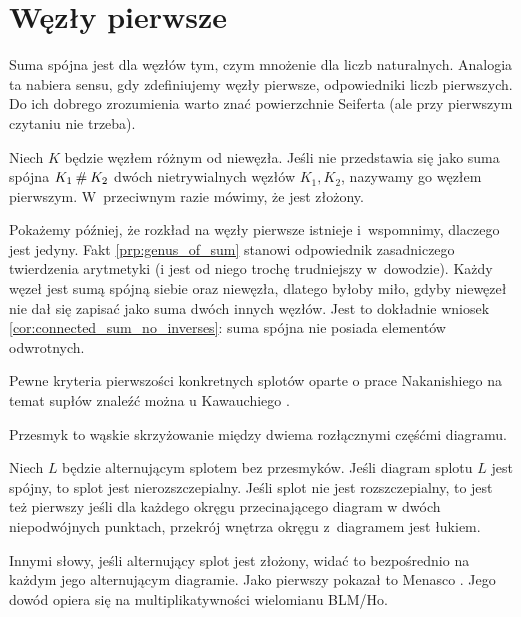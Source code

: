 
\section{Węzły pierwsze}
%
Suma spójna jest dla węzłów tym, czym mnożenie dla liczb naturalnych.
Analogia ta nabiera sensu, gdy zdefiniujemy węzły pierwsze, odpowiedniki liczb pierwszych.
Do ich dobrego zrozumienia warto znać powierzchnie Seiferta (ale przy pierwszym czytaniu nie trzeba).

\begin{definition}
\label{def:prime_knot}%
    Niech $K$ będzie węzłem różnym od niewęzła.
    Jeśli nie przedstawia się jako suma spójna $K_1 \mathbin{\#} K_2$ dwóch nietrywialnych węzłów $K_1, K_2$, nazywamy go węzłem pierwszym.
    W~przeciwnym razie mówimy, że jest złożony.
%
\end{definition}

Pokażemy później, że rozkład na węzły pierwsze istnieje i~wspomnimy, dlaczego jest jedyny.
Fakt \ref{prp:genus_of_sum} stanowi odpowiednik zasadniczego twierdzenia arytmetyki (i jest od niego trochę trudniejszy w~dowodzie).
Każdy węzeł jest sumą spójną siebie oraz niewęzła, dlatego byłoby miło, gdyby niewęzeł nie dał się zapisać jako suma dwóch innych węzłów.
Jest to dokładnie wniosek \ref{cor:connected_sum_no_inverses}: suma spójna nie posiada elementów odwrotnych.

Pewne kryteria pierwszości konkretnych splotów oparte o prace Nakanishiego na temat supłów znaleźć można u Kawauchiego \cite[s. 38-41]{kawauchi1996}.

Przesmyk to wąskie skrzyżowanie między dwiema rozłącznymi częśćmi diagramu.
%

\begin{proposition}
%
    Niech $L$ będzie alternującym splotem bez przesmyków.
    Jeśli diagram splotu $L$ jest spójny, to splot jest nierozszczepialny.
    Jeśli splot nie jest rozszczepialny, to jest też pierwszy jeśli dla każdego okręgu przecinającego diagram w dwóch niepodwójnych punktach, przekrój wnętrza okręgu z~diagramem jest łukiem.
\end{proposition}

Innymi słowy, jeśli alternujący splot jest złożony, widać to bezpośrednio na każdym jego alternującym diagramie.
Jako pierwszy pokazał to Menasco \cite{menasco1984}.
%
Jego dowód opiera się na multiplikatywności wielomianu BLM/Ho.
%

